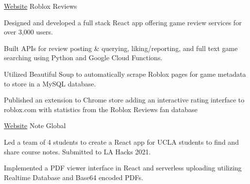

\begin{cventries}

\cventry
    {\href{https://www.roblox.reviews}{Website}} %
    {Roblox Reviews} %
    {} %
    {} %
    {
      \begin{cvitems} %
        \item {Designed and developed a full stack React app offering game
        review services for over 3,000 users.}
        \item {Built APIs for review posting \& querying, liking/reporting,
        and full text game searching using Python and Google Cloud Functions.}
        \item {Utilized Beautiful Soup to automatically scrape Roblox pages
        for game metadata to store in a MySQL database.}
        \item {Published an extension to Chrome store adding an interactive
        rating interface to roblox.com with statistics from the Roblox Reviews
        fan database}
      \end{cvitems}
    }

\cventry
    {\href{https://note-global.firebaseapp.com/}{Website}} %
    {Note Global} %
    {} %
    {} %
    {
      \begin{cvitems} %
        \item {Led a team of 4 students to create a React app for UCLA students
        to find and share course notes. Submitted to LA Hacks 2021.}
        \item {Implemented a PDF viewer interface in React and serverless
        uploading utilizing Realtime Database and Base64 encoded PDFs.}
      \end{cvitems}
    }


    
\end{cventries}
